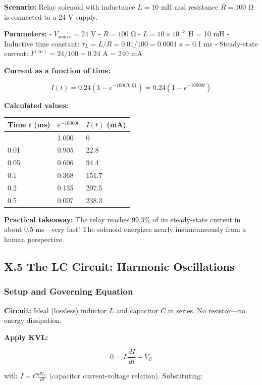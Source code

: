 \documentclass[
]{article}
\begin{document}
\textbf{Scenario:} Relay solenoid with inductance \(L = 10\) mH and
resistance \(R = 100\) Ω is connected to a 24 V supply.

\textbf{Parameters:} - \(V_{\text{source}} = 24\) V - \(R = 100\) Ω -
\(L = 10 \times 10^{-3}\) H = 10 mH - Inductive time constant:
\(\tau_L = L/R = 0.01/100 = 0.0001\) s = 0.1 ms - Steady-state current:
\(I^{(\infty)} = 24/100 = 0.24\) A = 240 mA

\textbf{Current as a function of time:}

\[I(t) = 0.24(1 - e^{-100t/0.01}) = 0.24(1 - e^{-10000t})\]

\textbf{Calculated values:}

\begin{longtable}[]{@{}lll@{}}
\toprule\noalign{}
Time \(t\) (ms) & \(e^{-10000t}\) & \(I(t)\) (mA) \\
\midrule\noalign{}
\endhead
\bottomrule\noalign{}
\endlastfoot
0 & 1.000 & 0 \\
0.01 & 0.905 & 22.8 \\
0.05 & 0.606 & 94.4 \\
0.1 & 0.368 & 151.7 \\
0.2 & 0.135 & 207.5 \\
0.5 & 0.007 & 238.3 \\
\end{longtable}

\textbf{Practical takeaway:} The relay reaches 99.3\% of its
steady-state current in about 0.5 ms---very fast! The solenoid energizes
nearly instantaneously from a human perspective.

\subsection{X.5 The LC Circuit: Harmonic
Oscillations}\label{x.5-the-lc-circuit-harmonic-oscillations}

\subsubsection{Setup and Governing
Equation}\label{setup-and-governing-equation-2}

\textbf{Circuit:} Ideal (lossless) inductor \(L\) and capacitor \(C\) in
series. No resistor---no energy dissipation.

\textbf{Apply KVL:}

\[0 = L\frac{dI}{dt} + V_C\]

with \(I = C\frac{dV_C}{dt}\) (capacitor current-voltage relation).
Substituting:
\end{document}
